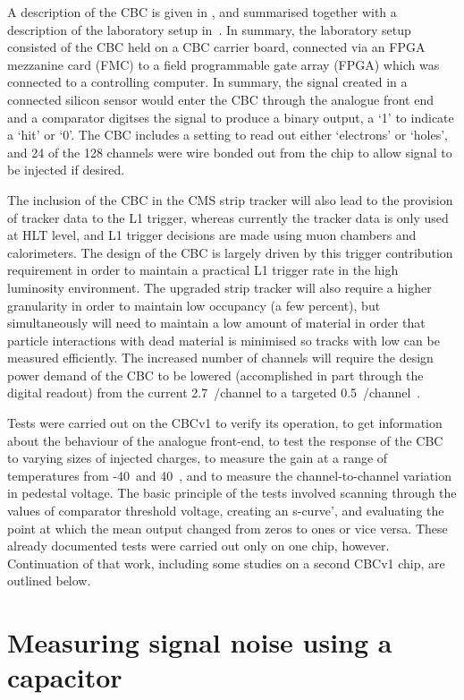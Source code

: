 A description of the CBC is given in \cite{JonesL}, and summarised together with a description of the
laboratory setup in~\cite{JacobJA}. In summary, the laboratory setup consisted of the CBC held on a CBC
carrier board, connected via an FPGA mezzanine card (FMC) to a field programmable gate array (FPGA) which was
connected to a controlling computer. In summary, the signal created in a connected silicon sensor would enter
the CBC through the analogue front end and a comparator digitses the signal to produce a binary output, a `1'
to indicate a `hit' or `0'. The CBC includes a setting to read out either `electrons' or `holes', and 24 of
the 128 channels were wire bonded out from the chip to allow signal to be injected if desired.

The inclusion of the CBC in the CMS strip tracker will also lead to the provision of tracker data to the L1
trigger, whereas currently the tracker data is only used at HLT level, and L1 trigger decisions are made using
muon chambers and calorimeters. The design of the CBC is largely driven by this trigger contribution
requirement in order to maintain a practical L1 trigger rate in the high luminosity environment. The upgraded
strip tracker will also require a higher granularity in order to maintain low occupancy (a few percent), but
simultaneously will need to maintain a low amount of material in order that particle interactions with dead
material is minimised so tracks with low \pt can be measured efficiently. The increased number of channels
will require the design power demand of the CBC to be lowered (accomplished in part through the digital
readout) from the current 2.7~\mW/channel to a targeted
0.5~\mW/channel~\cite{JonesL,Ferguson:2012cg,Raymond:2012zz}.

Tests were carried out on the CBCv1 to verify its operation, to get information about the behaviour of the
analogue front-end, to test the response of the CBC to varying sizes of injected charges, to measure the gain
at a range of temperatures from -40~\degreeCelsius and 40~\degreeCelsius, and to measure the
channel-to-channel variation in pedestal voltage. The basic principle of the tests involved scanning through
the values of comparator threshold voltage, creating an s-curve', and evaluating the point at which the mean
output changed from zeros to ones or vice versa. These already documented tests were carried out only on one
chip, however. Continuation of that work, including some studies on a second CBCv1 chip, are outlined below.

\section{Measuring signal noise using a capacitor}
\label{s:measuring_signal_noise_using_a_capacitor}

